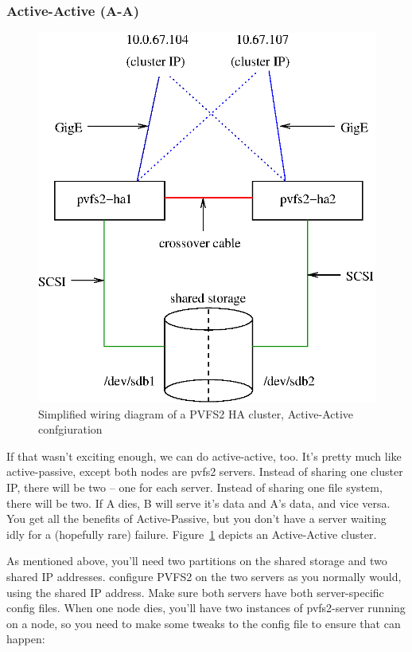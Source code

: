 \documentclass[11pt]{article}
\begin{document}
\subsubsection{Active-Active (A-A)}


\begin{figure}
\begin{center}
\includegraphics[scale=0.75]{pvfs2-failover-AA.eps}
\end{center}
\caption{Simplified wiring diagram of a PVFS2 HA cluster, Active-Active
confgiuration}
\label{fig:nodes-aa}
\end{figure}

If that wasn't exciting enough, we can do active-active, too.  It's
pretty much like active-passive, except both nodes are pvfs2 servers.
Instead of sharing one cluster IP, there will be two -- one for each
server.  Instead of sharing one file system, there will be two.  If A
dies, B will serve it's data and A's data, and vice versa.  You get all
the benefits of Active-Passive, but you don't have a server waiting idly
for a (hopefully rare) failure.   Figure~\ref{fig:nodes-aa} depicts an
Active-Active cluster.

As mentioned above, you'll need two partitions on the shared storage and
two shared IP addresses.  configure PVFS2 on the two servers as you
normally would, using the shared IP address.  Make sure both servers
have both server-specific config files.  When one node dies, you'll have
two instances of pvfs2-server running on a node, so you need to make
some tweaks to the config file to ensure that can happen: 
\end{document}
